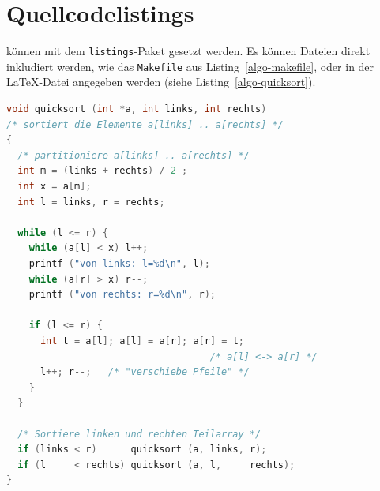 
\section{Quellcodelistings}

 können mit dem \texttt{listings}-Paket gesetzt werden.
Es können Dateien direkt inkludiert werden, wie das \texttt{Makefile} aus
Listing~\ref{algo-makefile}, oder in der \LaTeX-Datei angegeben werden (siehe
Listing~\ref{algo-quicksort}).


\begin{lstlisting}[language=c,
                   frame=single,           % Ein Rahmen um den Code
                   framexleftmargin=15pt,  % Rahmen link von den Zahlen
                   style=algoBericht,
                   label={algo-quicksort},
                   captionpos=b,           % Caption unter den Code setzen
		   caption={quicksort in C}]
void quicksort (int *a, int links, int rechts)
/* sortiert die Elemente a[links] .. a[rechts] */
{
  /* partitioniere a[links] .. a[rechts] */
  int m = (links + rechts) / 2 ;
  int x = a[m];
  int l = links, r = rechts;

  while (l <= r) {
    while (a[l] < x) l++;
    printf ("von links: l=%d\n", l);
    while (a[r] > x) r--;
    printf ("von rechts: r=%d\n", r);

    if (l <= r) {
      int t = a[l]; a[l] = a[r]; a[r] = t;
                                    /* a[l] <-> a[r] */
      l++; r--;   /* "verschiebe Pfeile" */
    }
  }

  /* Sortiere linken und rechten Teilarray */
  if (links < r)      quicksort (a, links, r);
  if (l     < rechts) quicksort (a, l,     rechts);
}
\end{lstlisting}

